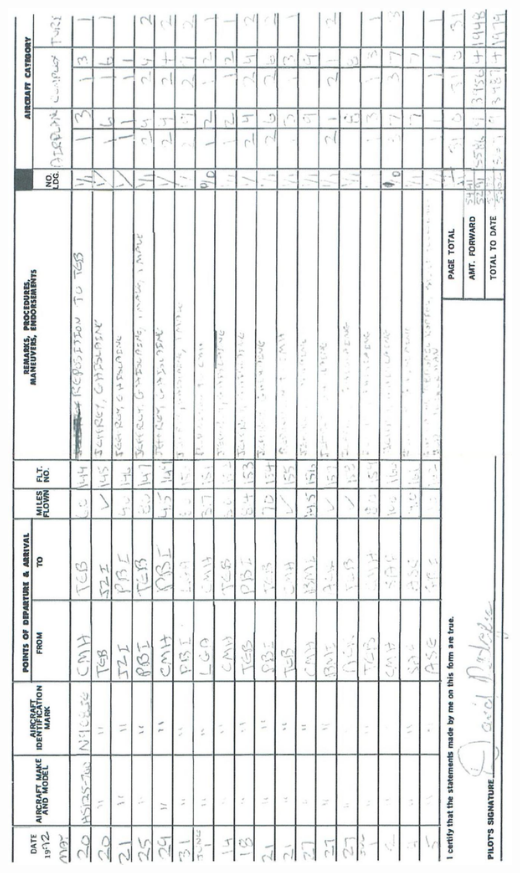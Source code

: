 \documentclass[10pt]{article}
\begin{document}
\includegraphics[max width=\textwidth, center]{2025_02_27_dd68c3d38de88f0516d9g-014}\\
\end{document}
